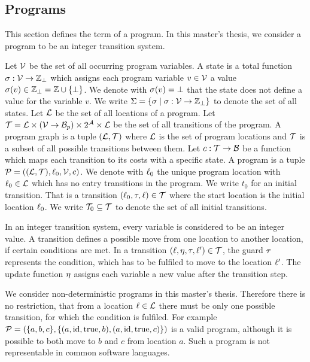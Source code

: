 \subsection{Programs}

This section defines the term of a program.
In this master's thesis, we consider a program to be an integer transition system.

\begin{definition}[Program] 
  Let $\mathcal{V}$ be the set of all occurring program variables.
  A state is a total function $\sigma: \mathcal{V} \rightarrow \mathbb{Z}_\bot$ which assigns each program variable $v \in \mathcal{V}$ a value $\sigma(v) \in \mathbb{Z}_\bot = \mathbb{Z} \cup \lbrace \bot \rbrace$.
  We denote with $\sigma(v) = \bot$ that the state does not define a value for the variable $v$.
  We write $\Sigma = \lbrace  \sigma \mid \sigma: \mathcal{V} \rightarrow \mathbb{Z}_\bot \rbrace$ to denote the set of all states.
  Let $\mathcal{L}$ be the set of all locations of a program.
  Let $\mathcal{T} = \mathcal{L} \times (\mathcal{V} \rightarrow \mathcal{B}_p) \times 2^{\mathcal{A}} \times \mathcal{L}$ be the set of all transitions of the program.
  A program graph is a tuple $(\mathcal{L}, \mathcal{T})$ where $\mathcal{L}$ is the set of program locations and $\mathcal{T}$ is a subset of all possible transitions between them.
  Let $c: \mathcal{T} \rightarrow \mathcal{B}$ be a function which maps each transition to its costs with a specific state.
  A program is a tuple $\mathcal{P} = ((\mathcal{L}, \mathcal{T}), \ell_0, \mathcal{V}, c)$.
  We denote with $\ell_0$ the unique program location with $\ell_0 \in \mathcal{L}$ which has no entry transitions in the program.
  We write $t_0$ for an initial transition. That is a transition $(\ell_0, \tau, \ell) \in \mathcal{T}$ where the start location is the initial location $\ell_0$.
  We write $\mathcal{T}_0 \subseteq \mathcal{T}$ to denote the set of all initial transitions.
\end{definition}

In an integer transition system, every variable is considered to be an integer value.
A transition defines a possible move from one location to another location, if certain conditions are met.
In a transition $(\ell,\eta,\tau,\ell') \in \mathcal{T}$, the guard $\tau$ represents the condition, which has to be fulfiled to move to the location $\ell'$. The update function $\eta$ assigns each variable a new value after the transition step.

We consider non-deterministic programs in this master's thesis.
Therefore there is no restriction, that from a location $\ell \in \mathcal{L}$ there must be only one possible transition, for which the condition is fulfiled.
For example $\mathcal{P} = (\lbrace a,b,c \rbrace,\lbrace (a,\text{id},\text{true},b),(a,\text{id},\text{true},c) \rbrace)$ is a valid program, although it is possible to both move to $b$ and $c$ from location $a$.
Such a program is not representable in common software languages.

